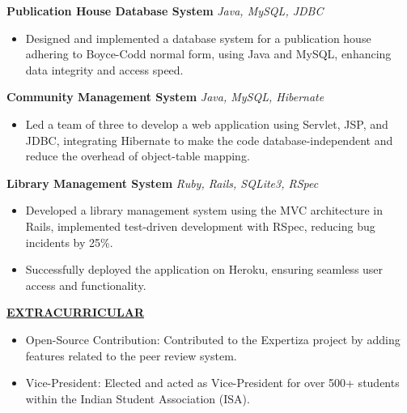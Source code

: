 \documentclass{article}
\begin{document}
\noindent \textbf{Publication House Database System} \textit{Java, MySQL, JDBC} \hfill \textbf{}
\begin{itemize}[noitemsep,nolistsep,leftmargin=*]
\item {\small Designed and implemented a database system for a publication house adhering to Boyce-Codd normal form, using Java and MySQL, enhancing data integrity and access speed.}
\end{itemize}

\noindent \textbf{Community Management System} \textit{Java, MySQL, Hibernate} \hfill \textbf{}
\begin{itemize}[noitemsep,nolistsep,leftmargin=*]
\item {\small Led a team of three to develop a web application using Servlet, JSP, and JDBC, integrating Hibernate to make the code database-independent and reduce the overhead of object-table mapping.}
\end{itemize}

\noindent \textbf{Library Management System} \textit{Ruby, Rails, SQLite3, RSpec} \hfill \textbf{}
\begin{itemize}[noitemsep,nolistsep,leftmargin=*]
\item {\small Developed a library management system using the MVC architecture in Rails, implemented test-driven development with RSpec, reducing bug incidents by 25\%.}
\item {\small Successfully deployed the application on Heroku, ensuring seamless user access and functionality.}\\
\end{itemize}

\noindent \textbf{\underline{EXTRACURRICULAR}} 
\begin{itemize}[noitemsep,nolistsep,leftmargin=*]
\item {\small Open-Source Contribution: Contributed to the Expertiza project by adding features related to the peer review system.}
\item {\small Vice-President: Elected and acted as Vice-President for over 500+ students within the Indian Student Association (ISA).}
\end{itemize}




\end{document}
